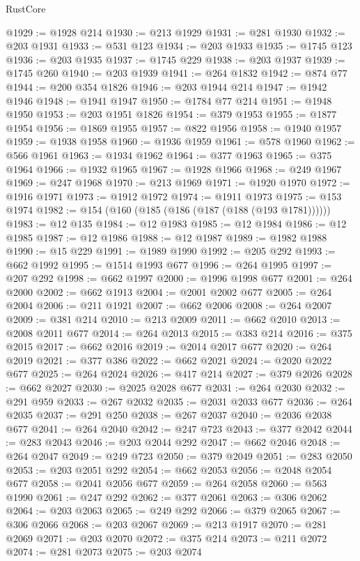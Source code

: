 \begin{lexlean}{RustCore}
\begin{coremodule}
@1929 := @1928 @214
@1930 := @213 @1929
@1931 := @281 @1930
@1932 := @203 @1931
@1933 := @531 @123
@1934 := @203 @1933
@1935 := @1745 @123
@1936 := @203 @1935
@1937 := @1745 @229
@1938 := @203 @1937
@1939 := @1745 @260
@1940 := @203 @1939
@1941 := @264 @1832
@1942 := @874 @77
@1944 := @200 @354 @1826
@1946 := @203 @1944 @214
@1947 := @1942 @1946
@1948 := @1941 @1947
@1950 := @1784 @77 @214
@1951 := @1948 @1950
@1953 := @203 @1951 @1826
@1954 := @379 @1953
@1955 := @1877 @1954
@1956 := @1869 @1955
@1957 := @822 @1956
@1958 := @1940 @1957
@1959 := @1938 @1958
@1960 := @1936 @1959
@1961 := @578 @1960
@1962 := @566 @1961
@1963 := @1934 @1962
@1964 := @377 @1963
@1965 := @375 @1964
@1966 := @1932 @1965
@1967 := @1928 @1966
@1968 := @249 @1967
@1969 := @247 @1968
@1970 := @213 @1969
@1971 := @1920 @1970
@1972 := @1916 @1971
@1973 := @1912 @1972
@1974 := @1911 @1973
@1975 := @153 @1974
@1982 := @154 (@160 (@185 (@186 (@187 (@188 (@193 @1781))))))
@1983 := @12 @135
@1984 := @12 @1983
@1985 := @12 @1984
@1986 := @12 @1985
@1987 := @12 @1986
@1988 := @12 @1987
@1989 := @1982 @1988
@1990 := @15 @229
@1991 := @1989 @1990
@1992 := @205 @292
@1993 := @662 @1992
@1995 := @1514 @1993 @677
@1996 := @264 @1995
@1997 := @207 @292
@1998 := @662 @1997
@2000 := @1996 @1998 @677
@2001 := @264 @2000
@2002 := @662 @1913
@2004 := @2001 @2002 @677
@2005 := @264 @2004
@2006 := @211 @1921
@2007 := @662 @2006
@2008 := @264 @2007
@2009 := @381 @214
@2010 := @213 @2009
@2011 := @662 @2010
@2013 := @2008 @2011 @677
@2014 := @264 @2013
@2015 := @383 @214
@2016 := @375 @2015
@2017 := @662 @2016
@2019 := @2014 @2017 @677
@2020 := @264 @2019
@2021 := @377 @386
@2022 := @662 @2021
@2024 := @2020 @2022 @677
@2025 := @264 @2024
@2026 := @417 @214
@2027 := @379 @2026
@2028 := @662 @2027
@2030 := @2025 @2028 @677
@2031 := @264 @2030
@2032 := @291 @959
@2033 := @267 @2032
@2035 := @2031 @2033 @677
@2036 := @264 @2035
@2037 := @291 @250
@2038 := @267 @2037
@2040 := @2036 @2038 @677
@2041 := @264 @2040
@2042 := @247 @723
@2043 := @377 @2042
@2044 := @283 @2043
@2046 := @203 @2044 @292
@2047 := @662 @2046
@2048 := @264 @2047
@2049 := @249 @723
@2050 := @379 @2049
@2051 := @283 @2050
@2053 := @203 @2051 @292
@2054 := @662 @2053
@2056 := @2048 @2054 @677
@2058 := @2041 @2056 @677
@2059 := @264 @2058
@2060 := @563 @1990
@2061 := @247 @292
@2062 := @377 @2061
@2063 := @306 @2062
@2064 := @203 @2063
@2065 := @249 @292
@2066 := @379 @2065
@2067 := @306 @2066
@2068 := @203 @2067
@2069 := @213 @1917
@2070 := @281 @2069
@2071 := @203 @2070
@2072 := @375 @214
@2073 := @211 @2072
@2074 := @281 @2073
@2075 := @203 @2074

\end{coremodule}
\end{lexlean}
